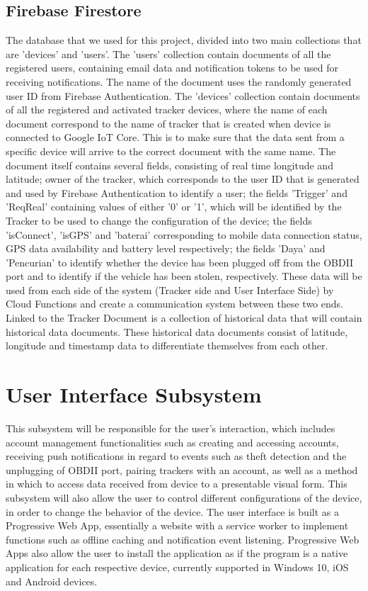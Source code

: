 \documentclass[conference]{IEEEtran}
\begin{document}
\subsection{Firebase Firestore}
The database that we used for this project, divided into two main collections that are 'devices' and 'users'. The 'users' collection contain documents of all the registered users, containing email data and notification tokens to be used for receiving notifications. The name of the document uses 
the randomly generated user ID from Firebase Authentication. The 'devices' collection contain documents of all the registered and activated tracker devices, where the name of each document correspond to the name of tracker that is created when device is connected to Google IoT Core. This is to make sure that the data sent from a specific device will arrive to the correct document with the same name. The document itself contains several fields, consisting of real time longitude and latitude; owner of the tracker, which corresponds to the user ID that is generated and used by Firebase Authentication to identify a user; the fields 'Trigger' and 'ReqReal' containing values of either '0' or '1', which will be identified by the Tracker to be used to change the configuration of the device; the fields 'isConnect', 'isGPS' and 'baterai' corresponding to mobile data connection status, GPS data availability and battery level respectively; the fields 'Daya' and 'Pencurian' to identify whether the device has been plugged off from the OBDII port and to identify if the vehicle has been stolen, respectively. These data will be used from each side of the system (Tracker side and User Interface Side) by Cloud Functions and create a communication system between these two ends. Linked to the Tracker Document is a collection of historical data that will contain historical data documents. These historical data documents consist of latitude, longitude and timestamp data to differentiate themselves from each other.

\section{User Interface Subsystem}
This subsystem will be responsible for the user’s interaction, which includes account management functionalities such as creating and accessing accounts, receiving push notifications in regard to events such as theft detection and the unplugging of OBDII port, pairing trackers with an account, as well as a method in which to access data received from device to a presentable visual form. This subsystem will also allow the user to control different configurations of the device, in order to change the behavior of the device. The user interface is built as a Progressive Web App, essentially a website with a service worker to implement functions such as offline caching and notification event listening. Progressive Web Apps also allow the user to install the application as if the program 
is a native application for each respective device, currently supported in Windows 10, iOS and Android devices. 
\end{document}
